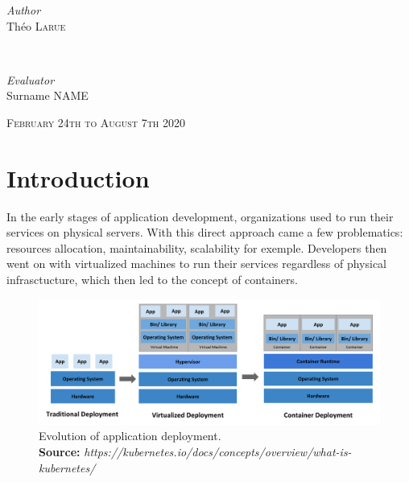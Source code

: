\documentclass[12pt]{report}
\newcommand*{\captionsource}[2]{%
    \caption[{#1}]{%
        #1%
        \\\hspace{\linewidth}%
	\textbf{Source:} \textit{#2}%
    }%
}
\begin{document}
\begin{titlepage}
    \begin{minipage}{0.4\textwidth}
        \begin{flushleft}
            \large
	    \textit{Author}\\
            Théo \textsc{Larue}
        \end{flushleft}
    \end{minipage}
    ~
    \begin{minipage}{0.4\textwidth}
        \begin{flushright}
            \large
	    \textit{Evaluator}\\
	    Surname \textsc{NAME}
        \end{flushright}
    \end{minipage}

    \vspace{2cm}

    \vspace{2cm}
    \vfill
    \textsc{\large February 24th to August 7th 2020}\\[0.5cm]


\end{titlepage}

\tableofcontents
\newpage

\chapter{Introduction}


In the early stages of application development, organizations used to run their
services on physical servers. With this direct approach came a few
problematics: resources allocation, maintainability, scalability for exemple.
Developers then went on with virtualized machines to run their services
regardless of physical infrasctucture, which then led to the concept of
containers.

\begin{figure}[]
	\centering
	\includegraphics[width=\textwidth]{imgs/container_evolution.png}
	\captionsource{Evolution of application deployment.}{https://kubernetes.io/docs/concepts/overview/what-is-kubernetes/}
	\label{fig:container-evolution}
\end{figure}
\end{document}
